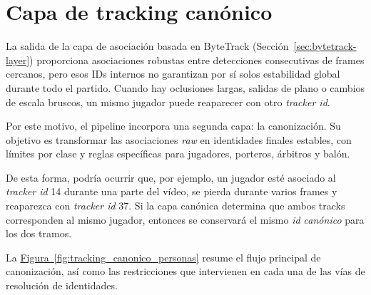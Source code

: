 \section{Capa de tracking canónico}
\label{sec:tracking-canonico}

La salida de la capa de asociación basada en ByteTrack (Sección~\ref{sec:bytetrack-layer}) proporciona asociaciones robustas entre detecciones consecutivas de frames cercanos, pero esos IDs internos no garantizan por sí solos estabilidad global durante todo el partido. Cuando hay oclusiones largas, salidas de plano o cambios de escala bruscos, un mismo jugador puede reaparecer con otro \textit{tracker id}.

Por este motivo, el pipeline incorpora una segunda capa: la canonización. Su objetivo es transformar las asociaciones \textit{raw} en identidades finales estables, con límites por clase y reglas específicas para jugadores, porteros, árbitros y balón.

De esta forma, podría ocurrir que, por ejemplo, un jugador esté asociado al \textit{tracker id} 14 durante una parte del vídeo, se pierda durante varios frames y reaparezca con \textit{tracker id} 37. Si la capa canónica determina que ambos tracks corresponden al mismo jugador, entonces se conservará el mismo \textit{id canónico} para los dos tramos.

La \hyperref[fig:tracking_canonico_personas]{Figura~\ref*{fig:tracking_canonico_personas}} resume el flujo principal de canonización, así como las restricciones que intervienen en cada una de las vías de resolución de identidades.

